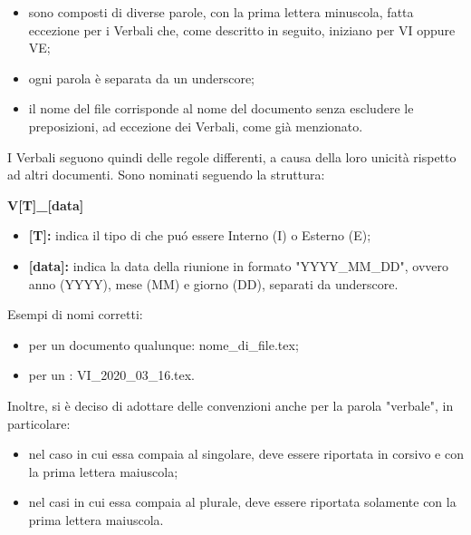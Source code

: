         \begin{itemize}
          \item sono composti di diverse parole, con la prima lettera minuscola, fatta eccezione per i Verbali che, come descritto in seguito, iniziano per VI oppure VE;
          \item ogni parola è separata da un underscore;
          \item il nome del file corrisponde al nome del documento senza escludere le preposizioni, ad eccezione dei Verbali, come già menzionato.
        \end{itemize}
        I Verbali seguono quindi delle regole differenti, a causa della loro unicità rispetto ad altri documenti. Sono nominati seguendo la struttura:
        \begin{center}
          \textbf{{V[T]\_[data]}}
        \end{center}
        \begin{itemize}
          \item \textbf{[T]:} indica il tipo di \Verbale{} che puó essere Interno (I) o Esterno (E);
          \item \textbf{[data]:} indica la data della riunione in formato "YYYY\_MM\_DD", ovvero anno (YYYY), mese (MM) e giorno (DD), separati da underscore.
        \end{itemize}
        Esempi di nomi corretti:
        \begin{itemize}
          \item per un documento qualunque: nome\_di\_file.tex;
          \item per un \Verbale{}: VI\_2020\_03\_16.tex.
        \end{itemize}
    	\noindent Inoltre, si è deciso di adottare delle convenzioni anche per la parola "verbale", in particolare:
    	\begin{itemize}
    		\item nel caso in cui essa compaia al singolare, deve essere riportata in corsivo e con la prima lettera maiuscola;
    		\item nel casi in cui essa compaia al plurale, deve essere riportata solamente con la prima lettera maiuscola.
    	\end{itemize}

